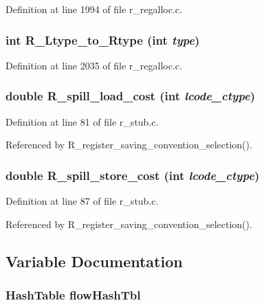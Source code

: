Definition at line 1994 of file r\_\-regalloc.c.
\subsubsection{\setlength{\rightskip}{0pt plus 5cm}int R\_\-Ltype\_\-to\_\-Rtype (int {\em type})}\label{r__regalloc_8h_d1bd8108e1f3ba8e661eecbaa540e5e5}




Definition at line 2035 of file r\_\-regalloc.c.
\subsubsection{\setlength{\rightskip}{0pt plus 5cm}double R\_\-spill\_\-load\_\-cost (int {\em lcode\_\-ctype})}\label{r__regalloc_8h_81182c2e2cc5adf59bae84752b07ad94}




Definition at line 81 of file r\_\-stub.c.

Referenced by R\_\-register\_\-saving\_\-convention\_\-selection().
\subsubsection{\setlength{\rightskip}{0pt plus 5cm}double R\_\-spill\_\-store\_\-cost (int {\em lcode\_\-ctype})}\label{r__regalloc_8h_b71237561fcf4fc259b3c85f949b14e7}




Definition at line 87 of file r\_\-stub.c.

Referenced by R\_\-register\_\-saving\_\-convention\_\-selection().

\subsection{Variable Documentation}
\subsubsection{\setlength{\rightskip}{0pt plus 5cm}\bf{Hash\-Table} \bf{flow\-Hash\-Tbl}}\label{r__regalloc_8h_9c212ddf99ef05a31beb28057eebde4a}




